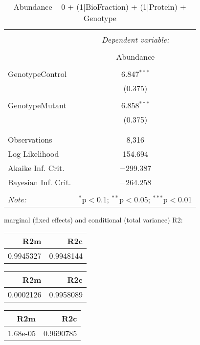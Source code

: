 \documentclass[11pt]{report}
\begin{document}
\begin{table}[!htbp] \centering 
  \caption{Abundance ~ 0 + (1|BioFraction) + (1|Protein) + Genotype} 
  \label{} 
\begin{tabular}{@{\extracolsep{5pt}}lc} 
\\[-1.8ex]\hline 
\hline \\[-1.8ex] 
 & \multicolumn{1}{c}{\textit{Dependent variable:}} \\ 
\cline{2-2} 
\\[-1.8ex] & Abundance \\ 
\hline \\[-1.8ex] 
 GenotypeControl & 6.847$^{***}$ \\ 
  & (0.375) \\ 
  & \\ 
 GenotypeMutant & 6.858$^{***}$ \\ 
  & (0.375) \\ 
  & \\ 
\hline \\[-1.8ex] 
Observations & 8,316 \\ 
Log Likelihood & 154.694 \\ 
Akaike Inf. Crit. & $-$299.387 \\ 
Bayesian Inf. Crit. & $-$264.258 \\ 
\hline 
\hline \\[-1.8ex] 
\textit{Note:}  & \multicolumn{1}{r}{$^{*}$p$<$0.1; $^{**}$p$<$0.05; $^{***}$p$<$0.01} \\ 
\end{tabular} 
\end{table} 
marginal (fixed effects) and conditional (total variance) R2:

\begin{tabular}{r|r}
\hline
R2m & R2c\\
\hline
0.9945327 & 0.9948144\\
\hline
\end{tabular}

\begin{tabular}{r|r}
\hline
R2m & R2c\\
\hline
0.0002126 & 0.9958089\\
\hline
\end{tabular}

\begin{tabular}{r|r}
\hline
R2m & R2c\\
\hline
1.68e-05 & 0.9690785\\
\hline
\end{tabular}
\end{document}
